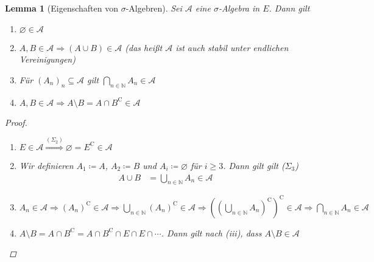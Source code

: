 \documentclass[11pt, twoside, a4paper]{article}
\theoremstyle{plain}
\newtheorem{lemma}[blockelement]{Lemma}
\numberwithin{equation}{subsection}
\newcommand{\pair}[1]{\left(#1\right)}
\newcommand{\impl}[0]{\Rightarrow{}}
\renewcommand{\emptyset}{\varnothing}
\newcommand{\dsty}{\displaystyle}
\newcommand{\comp}[1]{{#1}^{\mathrm{C}}}
\newcommand{\theoremescape}{\leavevmode}
\newcommand{\N}{\mathbb{N}}
\begin{document}
    \begin{lemma}[Eigenschaften von $\sigma$-Algebren]
        Sei $\mathcal{A}$ eine $\sigma$-Algebra in $E$. Dann gilt
        \begin{enumerate}[label=(\roman*)]
            \item $\emptyset\in\mathcal{A}$
            \item $A, B\in\mathcal{A} \impl \pair{A\cup B} \in\mathcal{A}$ (das heißt $\mathcal{A}$ ist auch stabil unter endlichen Vereinigungen)
            \item Für $(A_n)_n \subseteq \mathcal{A}$ gilt $\dsty\bigcap_{n\in\N} A_n \in\mathcal{A}$
            \item $A, B\in\mathcal{A} \impl A \setminus B = A \cap \comp{B} \in \mathcal{A}$
        \end{enumerate}

        \begin{proof}
            \theoremescape
            \begin{enumerate}[label=(\roman*)]
                \item $E\in\mathcal{A} \overset{(\Sigma_2)}{\impl} \emptyset = \comp{E} \in\mathcal{A}$
                \item Wir definieren $A_1 \coloneqq A$, $A_2 \coloneqq B$ und $A_i \coloneqq \emptyset$ für $i\geq 3$. Dann gilt gilt ($\Sigma_3$)
                \begin{align*}
                    A \cup B &= \bigcup_{n\in\N} A_n \in \mathcal{A}
                \end{align*}
                \item $A_n \in \mathcal{A} \impl \comp{\pair{A_n}} \in \mathcal{A} \impl \dsty\bigcup_{n\in\N} \comp{\pair{A_n}} \in \mathcal{A} \impl \comp{\pair{\comp{\pair{\bigcup_{n\in\N} A_n}}}} \in \mathcal{A} \impl \bigcap_{n\in\N} A_n\in\mathcal{A}$
                \item $A\setminus B = A \cap \comp{B} = A \cap \comp{B} \cap E \cap E \cap \cdots$. Dann gilt nach (iii), dass $A \setminus B \in\mathcal{A}$\qedhere
            \end{enumerate}
        \end{proof}
    \end{lemma}
\end{document}
